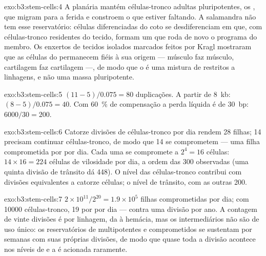 \begin{solution}{exo:b3:stem-cells:4}
A planária mantém células-tronco adultas pluripotentes, os ,
que migram para a ferida e constroem o que estiver faltando. A salamandra
não tem esse reservatório: células diferenciadas do coto se
desdiferenciam em  que, com células-tronco residentes do
tecido, formam um  que roda de novo o programa do membro. Os
enxertos de tecidos isolados marcados feitos por Kragl mostraram que as
células do  permanecem fiéis à sua origem --- músculo faz
músculo, cartilagem faz cartilagem ---, de modo que o  é uma
mistura de  restritos a linhagens, e não uma massa
pluripotente.
\end{solution}

\begin{solution}{exo:b3:stem-cells:5}
$(11 - 5)/0.075 = 80$ duplicações. A partir de \qty{8}{kb}: $(8 - 5)/0.075 = 40$. Com \qty{60}{\%} de compensação a perda líquida é de
\qty{30}{bp}: $6000/30
= 200$.
\end{solution}

\begin{solution}{exo:b3:stem-cells:6}
Catorze divisões de células-tronco por dia rendem 28 filhas; 14 precisam
continuar células-tronco, de modo que 14 se comprometem --- uma filha
comprometida por  por dia. Cada uma se compromete a $2^{4} = 16$ células: $14\times 16 = 224$ células de vilosidade por dia, a ordem
das \num{300} observadas (uma quinta divisão de trânsito dá \num{448}). O
nível das células-tronco contribui com divisões equivalentes a catorze
células; o nível de trânsito, com as outras \num{200}.
\end{solution}

\begin{solution}{exo:b3:stem-cells:7}
$2\times 10^{11}/2^{20} = 1.9\times 10^{5}$ filhas comprometidas por dia;
com \num{10000} células-tronco, 19 por  por dia --- contra
uma divisão por ano. A contagem de vinte divisões é por linhagem, da
 à hemácia, mas os  intermediários não são de
uso único: os reservatórios de  multipotentes e comprometidos
se sustentam por semanas com suas próprias divisões, de modo que quase
toda a divisão acontece nos níveis de  e a  é
acionada raramente.
\end{solution}

